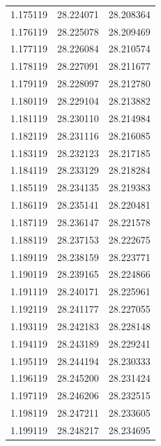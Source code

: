 \begin{tabular}{rrr}
1.175119 & 28.224071 & 28.208364 \\
1.176119 & 28.225078 & 28.209469 \\
1.177119 & 28.226084 & 28.210574 \\
1.178119 & 28.227091 & 28.211677 \\
1.179119 & 28.228097 & 28.212780 \\
1.180119 & 28.229104 & 28.213882 \\
1.181119 & 28.230110 & 28.214984 \\
1.182119 & 28.231116 & 28.216085 \\
1.183119 & 28.232123 & 28.217185 \\
1.184119 & 28.233129 & 28.218284 \\
1.185119 & 28.234135 & 28.219383 \\
1.186119 & 28.235141 & 28.220481 \\
1.187119 & 28.236147 & 28.221578 \\
1.188119 & 28.237153 & 28.222675 \\
1.189119 & 28.238159 & 28.223771 \\
1.190119 & 28.239165 & 28.224866 \\
1.191119 & 28.240171 & 28.225961 \\
1.192119 & 28.241177 & 28.227055 \\
1.193119 & 28.242183 & 28.228148 \\
1.194119 & 28.243189 & 28.229241 \\
1.195119 & 28.244194 & 28.230333 \\
1.196119 & 28.245200 & 28.231424 \\
1.197119 & 28.246206 & 28.232515 \\
1.198119 & 28.247211 & 28.233605 \\
1.199119 & 28.248217 & 28.234695 \\
\bottomrule
\end{tabular}
